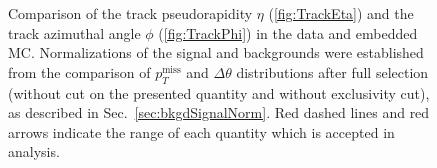 \begin{figure}[ht!]
\centering
\parbox{0.4725\textwidth}{
  \centering
  \begin{subfigure}[b]{\linewidth}{
                }
  \end{subfigure}
}%
\quad\quad%
\parbox{0.4725\textwidth}{%
  \centering
  \begin{subfigure}[b]{\linewidth}{
                }
  \end{subfigure}
}%
\caption[Comparison of distribution of track $\eta$ and $\phi$ in the data and embedded MC]
{Comparison of the track pseudorapidity $\eta$ (\ref{fig:TrackEta}) and the track azimuthal angle $\phi$ (\ref{fig:TrackPhi}) in the data and embedded MC. Normalizations of the signal and backgrounds were established from the comparison of $p_{T}^{\text{miss}}$ and $\Delta\theta$ distributions after full selection (without cut on the presented quantity and without exclusivity cut), as described in Sec.~\ref{sec:bkgdSignalNorm}. Red dashed lines and red arrows indicate the range of each quantity which is accepted in analysis.}\label{fig:TrackEtaPhi}
\end{figure}
